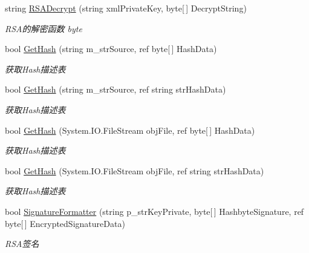 \begin{DoxyCompactItemize}
string \hyperlink{class_x_c_l_net_tools_1_1_encrypt_1_1_r_s_a_cryption_ab7bda8b65def11fd1bb4adf1384179f7}{R\+S\+A\+Decrypt} (string xml\+Private\+Key, byte\mbox{[}$\,$\mbox{]} Decrypt\+String)
\begin{DoxyCompactList}\small\item\em R\+S\+A的解密函数 byte \end{DoxyCompactList}\item 
bool \hyperlink{class_x_c_l_net_tools_1_1_encrypt_1_1_r_s_a_cryption_af5565911cb529cf571c4ffa79ee3cd98}{Get\+Hash} (string m\+\_\+str\+Source, ref byte\mbox{[}$\,$\mbox{]} Hash\+Data)
\begin{DoxyCompactList}\small\item\em 获取\+Hash描述表 \end{DoxyCompactList}\item 
bool \hyperlink{class_x_c_l_net_tools_1_1_encrypt_1_1_r_s_a_cryption_a453b18fdbccb2267733de128b72b2633}{Get\+Hash} (string m\+\_\+str\+Source, ref string str\+Hash\+Data)
\begin{DoxyCompactList}\small\item\em 获取\+Hash描述表 \end{DoxyCompactList}\item 
bool \hyperlink{class_x_c_l_net_tools_1_1_encrypt_1_1_r_s_a_cryption_aa17ed47b9801531c69d3a3572d78aee7}{Get\+Hash} (System.\+I\+O.\+File\+Stream obj\+File, ref byte\mbox{[}$\,$\mbox{]} Hash\+Data)
\begin{DoxyCompactList}\small\item\em 获取\+Hash描述表 \end{DoxyCompactList}\item 
bool \hyperlink{class_x_c_l_net_tools_1_1_encrypt_1_1_r_s_a_cryption_aab81fea26f9a3b878a00b42ee35d29fc}{Get\+Hash} (System.\+I\+O.\+File\+Stream obj\+File, ref string str\+Hash\+Data)
\begin{DoxyCompactList}\small\item\em 获取\+Hash描述表 \end{DoxyCompactList}\item 
bool \hyperlink{class_x_c_l_net_tools_1_1_encrypt_1_1_r_s_a_cryption_aedbefd6ab8da821fa2857aab5a997bd2}{Signature\+Formatter} (string p\+\_\+str\+Key\+Private, byte\mbox{[}$\,$\mbox{]} Hashbyte\+Signature, ref byte\mbox{[}$\,$\mbox{]} Encrypted\+Signature\+Data)
\begin{DoxyCompactList}\small\item\em R\+S\+A签名 \end{DoxyCompactList}\item 

\end{DoxyCompactItemize}
